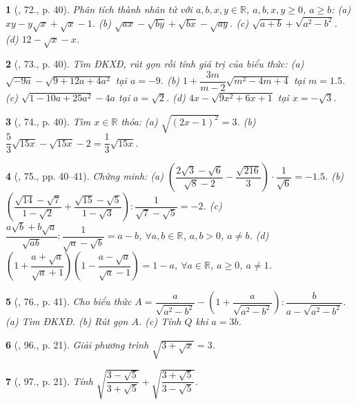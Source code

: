 \documentclass{article}
\newtheorem{baitoan}{}
\begin{document}
\begin{baitoan}[\cite{SGK_Toan_9_tap_1}, 72., p. 40]
	Phân tích thành nhân tử với $a,b,x,y\in\mathbb{R}$, $a,b,x,y\ge0$, $a\ge b$: (a) $xy - y\sqrt{x} + \sqrt{x} - 1$. (b) $\sqrt{ax} - \sqrt{by} + \sqrt{bx} - \sqrt{ay}$. (c) $\sqrt{a + b} + \sqrt{a^2 - b^2}$. (d) $12 - \sqrt{x} - x$.
\end{baitoan}

\begin{baitoan}[\cite{SGK_Toan_9_tap_1}, 73., p. 40]
	Tìm ĐKXĐ, rút gọn rồi tính giá trị của biểu thức: (a) $\sqrt{-9a} - \sqrt{9 + 12a + 4a^2}$ tại $a = -9$. (b) $1 + \dfrac{3m}{m - 2}\sqrt{m^2 - 4m + 4}$ tại $m = 1.5$. (c) $\sqrt{1 - 10a + 25a^2} - 4a$ tại $a = \sqrt{2}$. (d) $4x - \sqrt{9x^2 + 6x + 1}$ tại $x = -\sqrt{3}$.
\end{baitoan}

\begin{baitoan}[\cite{SGK_Toan_9_tap_1}, 74., p. 40]
	Tìm $x\in\mathbb{R}$ thỏa: (a) $\sqrt{(2x - 1)^2} = 3$. (b) $\dfrac{5}{3}\sqrt{15x} - \sqrt{15x} - 2 = \dfrac{1}{3}\sqrt{15x}$.
\end{baitoan}

\begin{baitoan}[\cite{SGK_Toan_9_tap_1}, 75., pp. 40--41]
	Chứng minh: (a) $\left(\dfrac{2\sqrt{3} - \sqrt{6}}{\sqrt{8} - 2} - \dfrac{\sqrt{216}}{3}\right)\cdot\dfrac{1}{\sqrt{6}} = -1.5$. (b) $\left(\dfrac{\sqrt{14} - \sqrt{7}}{1 - \sqrt{2}} + \dfrac{\sqrt{15} - \sqrt{5}}{1 - \sqrt{3}}\right):\dfrac{1}{\sqrt{7} - \sqrt{5}} = -2$. (c) $\dfrac{a\sqrt{b} + b\sqrt{a}}{\sqrt{ab}}:\dfrac{1}{\sqrt{a} - \sqrt{b}} = a - b$, $\forall a,b\in\mathbb{R}$, $a,b > 0$, $a\ne b$. (d) $\left(1 + \dfrac{a + \sqrt{a}}{\sqrt{a} + 1}\right)\left(1 - \dfrac{a - \sqrt{a}}{\sqrt{a} - 1}\right) = 1 - a$, $\forall a\in\mathbb{R}$, $a\ge0$, $a\ne1$.
\end{baitoan}

\begin{baitoan}[\cite{SGK_Toan_9_tap_1}, 76., p. 41]
	Cho biểu thức $A = \dfrac{a}{\sqrt{a^2 - b^2}} - \left(1 + \dfrac{a}{\sqrt{a^2 - b^2}}\right):\dfrac{b}{a - \sqrt{a^2 - b^2}}$. (a) Tìm ĐKXĐ. (b) Rút gọn $A$. (c) Tính $Q$ khi $a = 3b$.
\end{baitoan}

\begin{baitoan}[\cite{SBT_Toan_9_tap_1}, 96., p. 21]
	Giải phương trình $\sqrt{3 + \sqrt{x}} = 3$.
\end{baitoan}

\begin{baitoan}[\cite{SBT_Toan_9_tap_1}, 97., p. 21]
	Tính $\sqrt{\dfrac{3 - \sqrt{5}}{3 + \sqrt{5}}} + \sqrt{\dfrac{3 + \sqrt{5}}{3 - \sqrt{5}}}$.
\end{baitoan}
\end{document}
